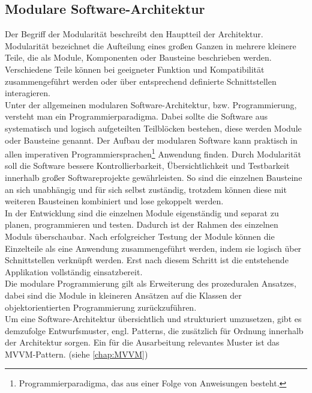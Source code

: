 \subsection{Modulare Software-Architektur}
\label{chap:Modulare Software Architektur}
Der Begriff der Modularität beschreibt den Hauptteil der Architektur. Modularität bezeichnet die Aufteilung eines großen Ganzen in 
mehrere kleinere Teile, die als Module, Komponenten oder Bausteine beschrieben werden. Verschiedene Teile können bei geeigneter Funktion 
und Kompatibilität zusammengeführt werden oder über entsprechend definierte Schnittstellen interagieren. 
\\ 
Unter der allgemeinen modularen Software-Architektur, bzw. Programmierung, versteht man ein Programmierparadigma. Dabei sollte die Software aus 
systematisch und logisch aufgeteilten Teilblöcken bestehen, diese werden Module oder Bausteine genannt. Der Aufbau der modularen Software kann 
praktisch in allen imperativen Programmiersprachen\footnote{Programmierparadigma, das aus einer Folge von Anweisungen besteht.} 
Anwendung finden. Durch Modularität soll die Software bessere Kontrollierbarkeit, Übersichtlichkeit und Testbarkeit innerhalb großer 
Softwareprojekte gewährleisten. So sind die einzelnen Bausteine an sich unabhängig und für sich selbst zuständig, trotzdem können 
diese mit weiteren Bausteinen kombiniert und lose gekoppelt werden. 
\\ 
In der Entwicklung sind die einzelnen Module eigenständig und separat zu planen, programmieren und testen. Dadurch ist der Rahmen des 
einzelnen Moduls überschaubar. Nach erfolgreicher Testung der Module können die Einzelteile als eine Anwendung 
zusammengeführt werden, indem sie logisch über Schnittstellen verknüpft werden. Erst nach diesem Schritt ist die 
entstehende Applikation vollständig einsatzbereit.
\\ 
Die modulare Programmierung gilt als Erweiterung des prozeduralen Ansatzes, dabei sind die Module in kleineren Ansätzen auf die Klassen 
der objektorientierten Programmierung zurückzuführen. \cite{modularesoftware.2018s}
\\
Um eine Software-Architektur übersichtlich und strukturiert umzusetzen, gibt es demzufolge Entwurfsmuster, engl. Patterns, die zusätzlich für 
Ordnung innerhalb der Architektur sorgen. Ein für die Ausarbeitung relevantes Muster ist das MVVM-Pattern. (siehe \ref{chap:MVVM})

